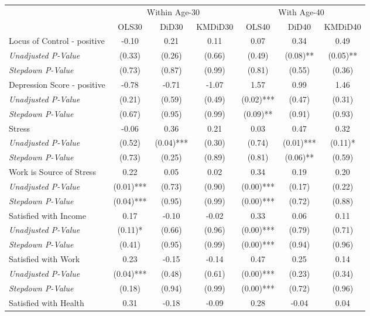 \begin{tabular}{l c c c c c c}
\toprule
& \multicolumn{3}{c}{Within Age-30} & \multicolumn{3}{c}{With Age-40} \\\cmidrule(lr){2-4} \cmidrule(lr){5-7}
 & OLS30 & DiD30 & KMDiD30 & OLS40 & DiD40 & KMDiD40 \\
\midrule
Locus of Control - positive & -0.10 & 0.21 & 0.11 & 0.07 & 0.34 & 0.49 \\
\quad \textit{Unadjusted P-Value} & (0.33) & (0.26) & (0.66) & (0.49) & (0.08)** & (0.05)** \\
\quad \textit{Stepdown P-Value} & (0.73) & (0.87) & (0.99) & (0.81) & (0.55) & (0.36) \\
Depression Score - positive & -0.78 & -0.71 & -1.07 & 1.57 & 0.99 & 1.46 \\
\quad \textit{Unadjusted P-Value} & (0.21) & (0.59) & (0.49) & (0.02)*** & (0.47) & (0.31) \\
\quad \textit{Stepdown P-Value} & (0.67) & (0.95) & (0.99) & (0.09)** & (0.91) & (0.93) \\
Stress & -0.06 & 0.36 & 0.21 & 0.03 & 0.47 & 0.32 \\
\quad \textit{Unadjusted P-Value} & (0.52) & (0.04)*** & (0.30) & (0.74) & (0.01)*** & (0.11)* \\
\quad \textit{Stepdown P-Value} & (0.73) & (0.25) & (0.89) & (0.81) & (0.06)** & (0.59) \\
Work is Source of Stress & 0.22 & 0.05 & 0.02 & 0.34 & 0.19 & 0.20 \\
\quad \textit{Unadjusted P-Value} & (0.01)*** & (0.73) & (0.90) & (0.00)*** & (0.17) & (0.22) \\
\quad \textit{Stepdown P-Value} & (0.04)*** & (0.95) & (0.99) & (0.00)*** & (0.72) & (0.88) \\
Satisfied with Income & 0.17 & -0.10 & -0.02 & 0.33 & 0.06 & 0.11 \\
\quad \textit{Unadjusted P-Value} & (0.11)* & (0.66) & (0.96) & (0.00)*** & (0.79) & (0.71) \\
\quad \textit{Stepdown P-Value} & (0.41) & (0.95) & (0.99) & (0.00)*** & (0.94) & (0.96) \\
Satisfied with Work & 0.23 & -0.15 & -0.14 & 0.47 & 0.25 & 0.14 \\
\quad \textit{Unadjusted P-Value} & (0.04)*** & (0.48) & (0.61) & (0.00)*** & (0.23) & (0.34) \\
\quad \textit{Stepdown P-Value} & (0.18) & (0.94) & (0.99) & (0.00)*** & (0.72) & (0.96) \\
Satisfied with Health & 0.31 & -0.18 & -0.09 & 0.28 & -0.04 & 0.04 \\

\end{tabular}
